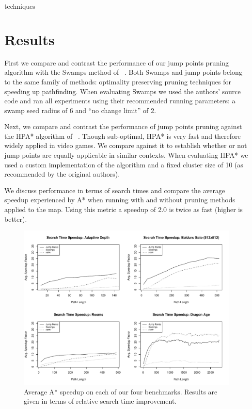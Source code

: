 techniques\section{Results}
First we compare and contrast the performance of our jump points
pruning algorithm with the Swamps method of
\citeauthor{pochter10}~. 
Both Swamps and jump points belong to the same family of methods:
optimality preserving pruning techniques for speeding up pathfinding.
When evaluating Swamps we used the authors'
source code and ran all experiments using their recommended running parameters:
a swamp seed radius of 6 and ``no change limit'' of 2. 
\par
Next, we compare and contrast the performance of jump points pruning 
against the HPA* algorithm of \citeauthor{botea04}~.
Though sub-optimal, HPA* is very fast and therefore widely applied in video
games. We compare against it to establish whether or not jump points are 
equally applicable in similar contexts. 
When evaluating HPA* we used a custom implementation of the algorithm and a
fixed cluster size of 10 (as recommended by the original authors).
\par
We discuss performance in terms of search times and compare 
the average speedup experienced by A* when running with and
without pruning methods applied to the map.  Using this metric a speedup of
2.0 is twice as fast (higher is better).

\begin{figure}[t]
   \begin{center}
	   \includegraphics[width=2.0\columnwidth, trim = 10mm 10mm 10mm 0mm]
		{diagrams/speedup.pdf}
   \end{center}
   \caption{Average A* speedup on each of our four benchmarks. 
	Results are given in terms of relative search time improvement.}
\label{fig:speedup}
\end{figure}
